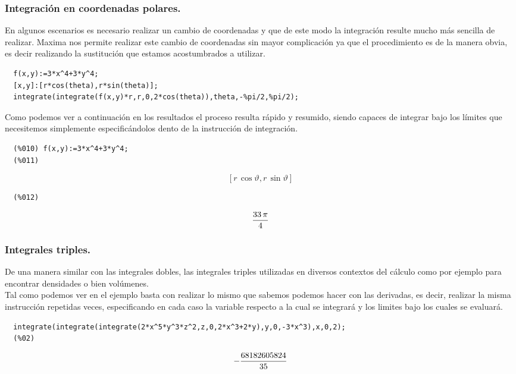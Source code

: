 \documentclass[12pt]{article}
\begin{document}
  \subsubsection*{Integración en coordenadas polares.}
  
  En algunos escenarios es necesario realizar un cambio de coordenadas y que de este modo la integración resulte mucho más sencilla de realizar. Maxima nos permite realizar este cambio de coordenadas sin mayor complicación ya que el procedimiento es de la manera obvia, es decir realizando la sustitución que estamos acostumbrados a utilizar.
  
  \begin{verbatim}
  f(x,y):=3*x^4+3*y^4;
  [x,y]:[r*cos(theta),r*sin(theta)];
  integrate(integrate(f(x,y)*r,r,0,2*cos(theta)),theta,-%pi/2,%pi/2);
  \end{verbatim}
  
  Como podemos ver a continuación en los resultados el proceso resulta rápido y resumido, siendo capaces de integrar bajo los límites que necesitemos simplemente especificándolos dento de la instrucción de integración.
  
  \begin{verbatim}
  (%010) f(x,y):=3*x^4+3*y^4;
  (%011)
  \end{verbatim}
  $$\left[ r\,\cos \vartheta , r\,\sin \vartheta \right] $$
  \begin{verbatim}
  (%012)
  \end{verbatim}
  $${{33\,\pi}\over{4}}$$
  
  \subsubsection*{Integrales triples.}
  
  De una manera similar con las integrales dobles, las integrales triples utilizadas en diversos contextos del cálculo como por ejemplo para encontrar densidades o bien volúmenes.\\
  
  Tal como podemos ver en el ejemplo basta con realizar lo mismo que sabemos podemos hacer con las derivadas, es decir, realizar la misma instrucción repetidas veces, especificando en cada caso la variable respecto a la cual se integrará y los limites bajo los cuales se evaluará.
  \begin{verbatim}
  integrate(integrate(integrate(2*x^5*y^3*z^2,z,0,2*x^3+2*y),y,0,-3*x^3),x,0,2);
  (%02)
  \end{verbatim}
  $$-{{68182605824}\over{35}}$$
  
\end{document}
